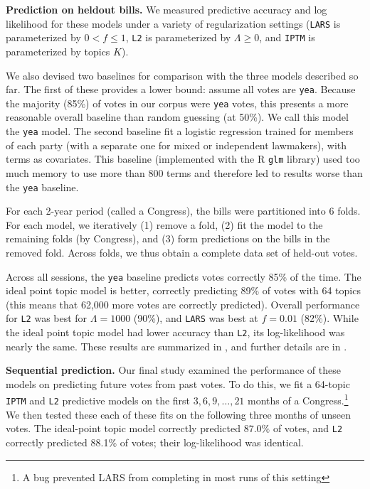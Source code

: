 \textbf{Prediction on heldout bills.}  We measured predictive accuracy
and log likelihood for these models under a variety of regularization
settings (\verb!LARS! is parameterized by $0 < f \le 1$, \verb!L2! is
parameterized by $\Lambda \ge 0$, and \verb!IPTM! is parameterized by
topics $K$).

We also devised two baselines for comparison with the three models
described so far.  The first of these provides a lower bound: assume
all votes are \verb!yea!.  Because the majority (85\%) of votes in our
corpus were \verb!yea! votes, this presents a more reasonable overall
baseline than random guessing (at 50\%).  We call this model the
\verb!yea!  model.  The second baseline fit a logistic regression
trained for members of each party (with a separate one for mixed or
independent lawmakers), with terms as covariates.  This baseline
(implemented with the R \verb!glm! library) used too much memory to
use more than 800 terms and therefore led to results worse than the
\verb!yea!  baseline.

For each 2-year period (called a Congress), the bills were partitioned
into 6 folds.  For each model, we iteratively (1) remove a fold, (2)
fit the model to the remaining folds (by Congress), and (3) form
predictions on the bills in the removed fold.  Across folds, we thus
obtain a complete data set of held-out votes.

Across all sessions, the \verb!yea! baseline predicts votes correctly
85\% of the time.  The ideal point topic model is better, correctly
predicting 89\% of votes with 64 topics (this means that 62,000 more
votes are correctly predicted).  Overall performance for \verb!L2! was
best for $\Lambda=1000$ (90\%), and \verb!LARS! was best at $f=0.01$
(82\%).  While the ideal point topic model had lower accuracy than
\verb!L2!, its log-likelihood was nearly the same.  These results are
summarized in , and further details are in
.

\textbf{Sequential prediction.}  Our final study examined the
performance of these models on predicting future votes from past
votes.  To do this, we fit a 64-topic \verb!IPTM! and \verb!L2!
predictive models on the first $3, 6, 9, \ldots, 21$ months of a
Congress.\footnote{A bug prevented LARS from completing in most runs of
this setting}  We then tested these each of these fits on the
following three months of unseen votes.  The ideal-point topic model
correctly predicted $87.0\%$ of votes, and \verb!L2!  correctly
predicted 88.1\% of votes; their log-likelihood was identical.

